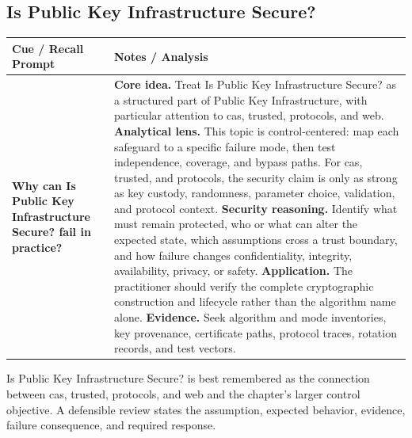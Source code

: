 \documentclass[11pt]{article}
\newcommand{\CornellHeader}{%
\rowcolor{Navy}\color{white}\bfseries Cue / Recall Prompt & \color{white}\bfseries Notes / Analysis\\\hline}
\newcommand{\CornellRow}[2]{%
\cellcolor{CueGray}\RaggedRight\textbf{#1} & \RaggedRight #2\\\hline}
\begin{document}
\subsection*{Is Public Key Infrastructure Secure?}
\begin{longtable}{>{\RaggedRight\arraybackslash}p{}|>{\RaggedRight\arraybackslash}p{}}
\CornellHeader
\CornellRow{Why can Is Public Key Infrastructure Secure? fail in practice?}{\textbf{Core idea.} Treat Is Public Key Infrastructure Secure? as a structured part of Public Key Infrastructure, with particular attention to cas, trusted, protocols, and web. \textbf{Analytical lens.} This topic is control-centered: map each safeguard to a specific failure mode, then test independence, coverage, and bypass paths. For cas, trusted, and protocols, the security claim is only as strong as key custody, randomness, parameter choice, validation, and protocol context. \textbf{Security reasoning.} Identify what must remain protected, who or what can alter the expected state, which assumptions cross a trust boundary, and how failure changes confidentiality, integrity, availability, privacy, or safety. \textbf{Application.} The practitioner should verify the complete cryptographic construction and lifecycle rather than the algorithm name alone. \textbf{Evidence.} Seek algorithm and mode inventories, key provenance, certificate paths, protocol traces, rotation records, and test vectors.}
\end{longtable}
\begin{topicsummary}
Is Public Key Infrastructure Secure? is best remembered as the connection between cas, trusted, protocols, and web and the chapter's larger control objective. A defensible review states the assumption, expected behavior, evidence, failure consequence, and required response.
\end{topicsummary}
\end{document}
